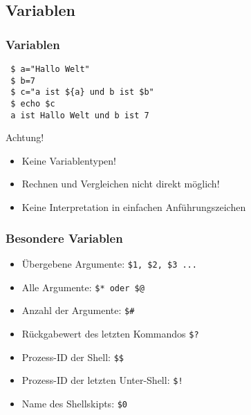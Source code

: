 \documentclass{beamer}
\begin{document}
\subsection{Variablen}
\begin{frame}[fragile]
 \frametitle{Variablen}
 
 \begin{verbatim}
 $ a="Hallo Welt"
 $ b=7
 $ c="a ist ${a} und b ist $b"
 $ echo $c
 a ist Hallo Welt und b ist 7
 \end{verbatim}
 
 \begin{alertblock}{Achtung!}
  \begin{itemize}
   \item Keine Variablentypen!
   \item Rechnen und Vergleichen nicht direkt möglich!
   \item Keine Interpretation in einfachen Anführungszeichen
  \end{itemize}
 \end{alertblock}
\end{frame}

\begin{frame}[<+->]
 \frametitle{Besondere Variablen}
 
 \begin{itemize}
  \item Übergebene Argumente: \tt\$1, \$2, \$3 ...
  \item Alle Argumente: \tt\$* oder \$@
  \item Anzahl der Argumente: \tt\$\#
  \item Rückgabewert des letzten Kommandos \tt\$?
  \item Prozess-ID der Shell: \tt\$\$
  \item Prozess-ID der letzten Unter-Shell: \tt\$!
  \item Name des Shellskipts: \tt\$0
 \end{itemize}
\end{frame}
\end{document}
